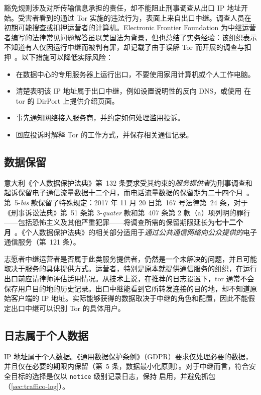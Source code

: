 豁免规则涉及对所传输信息承担的责任，却不能阻止刑事调查从出口 IP 地址开始。受害者看到的通过 Tor 实施的违法行为，表面上来自出口中继。调查人员在初期可能搜查或扣押运营者的计算机。Electronic Frontier Foundation 为中继运营者编写的法律常见问题解答虽以美国法为背景，但也总结了实务经验：该组织表示不知道有人仅因运行中继而被判有罪，却记载了由于误解 Tor 而开展的调查与扣押~\cite{efflegalfaq}。以下措施可以降低实际风险：
\begin{itemize}
  \item 在数据中心的专用服务器上运行出口，不要使用家用计算机或个人工作电脑。
  \item 清楚表明该 IP 地址属于出口中继，例如设置说明性的反向 DNS，或使用  在 tor 的 DirPort 上提供介绍页面。
  \item 事先通知网络接入服务商，并约定如何处理滥用投诉。
  \item 回应投诉时解释 Tor 的工作方式，并保存相关通信记录。
\end{itemize}

\subsection{数据保留}

意大利《个人数据保护法典》第~132 条要求受其约束的\emph{服务提供者}为刑事调查和起诉保留电子通信流量数据十二个月，而电话流量数据的保留期为二十四个月~\cite{codiceprivacy}。第~5-\emph{bis} 款保留了特殊规定：2017 年 11 月 20 日第~167 号法律第~24 条，对于《刑事诉讼法典》第~51 条第 3-\emph{quater} 款和第~407 条第 2 款（a）项列明的罪行——包括恐怖主义及其他严重犯罪——将调查所需的保留期限延长为\textbf{七十二个月}~\cite{legge167}。《个人数据保护法典》的相关部分适用于\emph{通过公共通信网络向公众提供的}电子通信服务（第~121 条）。

志愿者中继运营者是否属于此类服务提供者，仍然是一个未解决的问题，并且可能取决于服务的具体提供方式。运营者，特别是原本就提供通信服务的组织，在运行出口前应请律师评估适用情况。从技术上说，在推荐的日志设置下，tor 通常不会保存用户目的地的历史记录。出口中继能看到它所转发连接的目的地，却不知道原始客户端的 IP 地址。实际能够获得的数据取决于中继的角色和配置，因此不能假定出口中继可以识别 Tor 的具体用户。

\subsection{日志属于个人数据}

IP 地址属于个人数据。《通用数据保护条例》（GDPR）要求仅处理必要的数据，并且仅在必要的期限内保留（第~5 条，数据最小化原则）。对于中继而言，符合安全目标的选择是仅以 \texttt{notice} 级别记录日志，保持  启用，并避免抓包（\cref{sec:traffico-log}）。

